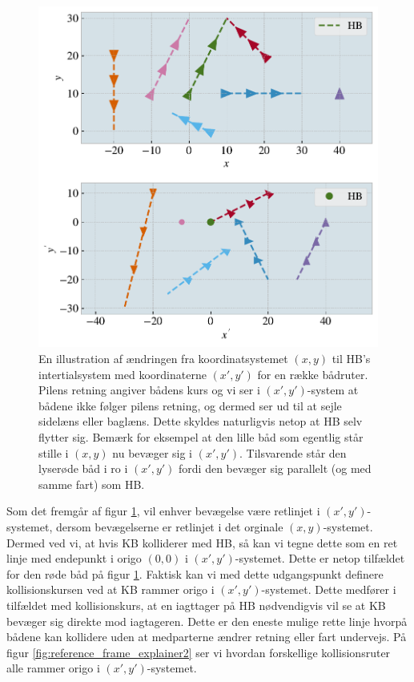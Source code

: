 \documentclass[%
 reprint,
nofootinbib,
aps,
]{revtex4-1}
\begin{document}
\begin{figure}[H]
  \includegraphics[width=\linewidth]{figures/reference_frame_explainer.pdf}
  \caption{En illustration af ændringen fra koordinatsystemet $(x,y)$ til HB's intertialsystem med koordinaterne  $(x',y')$ for en række bådruter. Pilens retning angiver bådens kurs og vi ser i $(x',y')$-system at bådene ikke følger pilens retning, og dermed ser ud til at sejle sidelæns eller baglæns. Dette skyldes naturligvis netop at HB selv flytter sig. Bemærk for eksempel at den lille båd som egentlig står stille i $(x,y)$ nu bevæger sig i  $(x',y')$. Tilsvarende står den lyserøde båd i ro i $(x',y')$ fordi den bevæger sig parallelt (og med samme fart) som HB. }
  \label{fig:reference_frame_explainer}
\end{figure}

Som det fremgår af figur \ref{fig:reference_frame_explainer}, vil enhver bevægelse være retlinjet i $(x',y')$-systemet, dersom bevægelserne er retlinjet i det orginale $(x,y)$-systemet. Dermed ved vi, at hvis KB kolliderer med HB, så kan vi tegne dette som en ret linje med endepunkt i origo $(0,0)$ i $(x',y')$-systemet. Dette er netop tilfældet for den røde båd på figur \ref{fig:reference_frame_explainer}. Faktisk kan vi med dette udgangspunkt definere kollisionskursen ved at KB rammer origo i $(x',y')$-systemet. Dette medfører i tilfældet med kollisionskurs, at en iagttager på HB nødvendigvis vil se at KB bevæger sig direkte mod iagtageren. Dette er den eneste mulige rette linje hvorpå bådene kan kollidere uden at medparterne ændrer retning eller fart undervejs. På figur \ref{fig:reference_frame_explainer2} ser vi hvordan forskellige kollisionsruter alle rammer origo i $(x',y')$-systemet.
\end{document}
